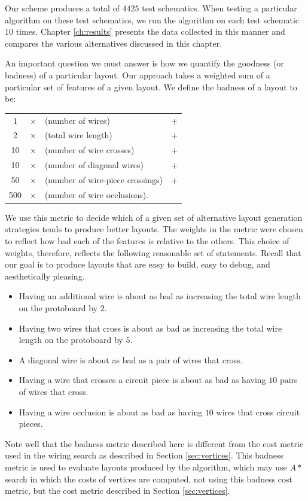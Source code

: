 Our scheme produces a total of $4425$ test schematics.
When testing a particular algorithm on these test
schematics, we run the algorithm on each test schematic $10$ times. Chapter
\ref{ch:results} presents the data collected in this manner and compares the
various alternatives discussed in this chapter.

An important question we must answer is how we quantify the goodness (or badness)
of a particular layout. Our approach takes a weighted sum of a particular set of
features of a given layout. We define the badness of a layout to be:
\begin{table}[H]
\centering
\begin{tabular}{ccll}
1 &$\times$ &(number of wires) &+ \\
2 &$\times$ &(total wire length) &+ \\
10 &$\times$ &(number of wire crosses) &+ \\
10 &$\times$ &(number of diagonal wires) &+ \\
50 &$\times$ &(number of wire-piece crossings) &+ \\
500 &$\times$ &(number of wire occlusions).
\end{tabular}
\end{table}
We use this metric to decide which of a given set of alternative
layout generation strategies tends to produce better layouts.
The weights in the metric were chosen to reflect how
bad each of the features is relative to the others. This choice of weights,
therefore, reflects the following reasonable set of statements. Recall that our
goal is to produce layouts that are easy to build, easy to debug, and
aesthetically pleasing.
\begin{itemize}
\item Having an additional wire is about as bad as increasing the total wire
length on the protoboard by $2$.
\item Having two wires that cross is about as bad as increasing the total
wire length on the protoboard by $5$.
\item A diagonal wire is about as bad as a pair of wires that cross.
\item Having a wire that crosses a circuit piece is about as bad as having $10$
pairs of wires that cross.
\item Having a wire occlusion is about as bad as having $10$ wires that cross
circuit pieces.
\end{itemize}

Note well that the badness metric described here is different from the cost
metric used in the wiring search as described in Section \ref{sec:vertices}.
This badness metric is used to evaluate layouts produced by the algorithm,
which may use $A*$ search in which the costs of vertices are computed, not using
this badness cost metric, but the cost metric described in Section
\ref{sec:vertices}.

\newpage\null\newpage
